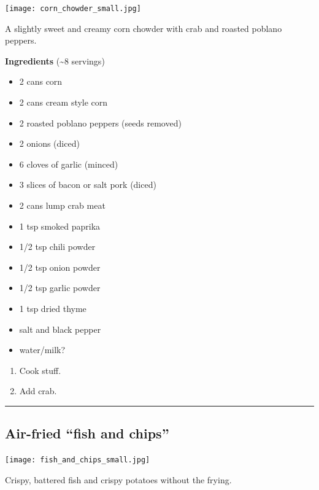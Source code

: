 \documentclass[
]{book}
\providecommand{\tightlist}{%
  \setlength{\itemsep}{0pt}\setlength{\parskip}{0pt}}
\begin{document}
\texttt{[image: corn\_chowder\_small.jpg]}

A slightly sweet and creamy corn chowder with crab and roasted poblano peppers.

\begin{blackbox}

\textbf{Ingredients} (\textasciitilde8 servings)

\begin{itemize}
\tightlist
\item
  2 cans corn
\item
  2 cans cream style corn
\item
  2 roasted poblano peppers (seeds removed)
\item
  2 onions (diced)
\item
  6 cloves of garlic (minced)
\item
  3 slices of bacon or salt pork (diced)
\item
  2 cans lump crab meat
\item
  1 tsp smoked paprika
\item
  1/2 tsp chili powder
\item
  1/2 tsp onion powder
\item
  1/2 tsp garlic powder
\item
  1 tsp dried thyme
\item
  salt and black pepper
\item
  water/milk?
\end{itemize}

\end{blackbox}

\begin{enumerate}
\def\labelenumi{\arabic{enumi}.}
\item
  Cook stuff.
\item
  Add crab.
\end{enumerate}

\begin{center}\rule{0.5\linewidth}{0.5pt}\end{center}

\hypertarget{fishandchips}{%
\subsection*{Air-fried ``fish and chips''}\label{fishandchips}}

\texttt{[image: fish\_and\_chips\_small.jpg]}

Crispy, battered fish and crispy potatoes without the frying.
\end{document}
